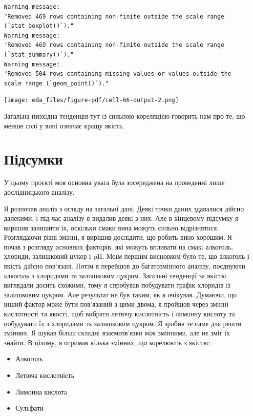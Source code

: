 \documentclass[
  letterpaper,
  DIV=11,
  numbers=noendperiod]{scrreprt}
\providecommand{\tightlist}{%
  \setlength{\itemsep}{0pt}\setlength{\parskip}{0pt}}\usepackage{longtable,booktabs,array}
\begin{document}
\begin{verbatim}
Warning message:
"Removed 469 rows containing non-finite outside the scale range (`stat_boxplot()`)."
Warning message:
"Removed 469 rows containing non-finite outside the scale range (`stat_summary()`)."
Warning message:
"Removed 504 rows containing missing values or values outside the scale range (`geom_point()`)."
\end{verbatim}

\texttt{[image: eda\_files/figure-pdf/cell-66-output-2.png]}

Загальна низхідна тенденція тут із сильною кореляцією говорить нам про
те, що менше солі у вині означає кращу якість.

\section{Підсумки}\label{ux43fux456ux434ux441ux443ux43cux43aux438}

У цьому проєкті моя основна увага була зосереджена на проведенні лише
дослідницького аналізу.

Я розпочав аналіз з огляду на загальні дані. Деякі точки даних здавалися
дійсно далекими, і під час аналізу я видалив деякі з них. Але в
кінцевому підсумку я вирішив залишити їх, оскільки смаки вина можуть
сильно відрізнятися. Розглядаючи різні змінні, я вирішив дослідити, що
робить вино хорошим. Я почав з розгляду основних факторів, які можуть
впливати на смак: алкоголь, хлориди, залишковий цукор і pH. Моїм першим
висновком було те, що алкоголь і якість дійсно пов'язані. Потім я
перейшов до багатозмінного аналізу, поєднуючи алкоголь з хлоридами та
залишковим цукром. Загальні тенденції за якістю виглядали досить
схожими, тому я спробував побудувати графік хлоридів із залишковим
цукром. Але результат не був таким, як я очікував. Думаючи, що інший
фактор може бути пов'язаний з цими двома, я пройшов через змінні
кислотності та якості, щоб вибрати летючу кислотність і лимонну кислоту
та побудувати їх з хлоридами та залишковим цукром. Я зробив те саме для
решти змінних. Я шукав більш складні взаємозв'язки між змінними, але не
зміг їх знайти. В цілому, я отримав кілька змінних, що корелюють з
якістю:

\begin{itemize}
\tightlist
\item
  Алкоголь
\item
  Летюча кислотність
\item
  Лимонна кислота
\item
  Сульфати
\end{itemize}
\end{document}
